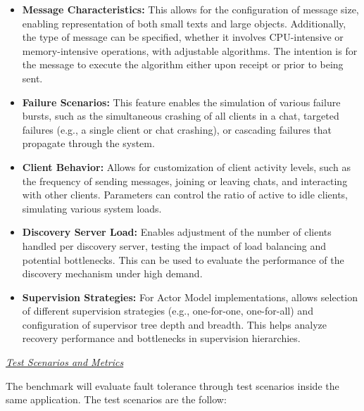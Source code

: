 \begin{itemize}
    \item \textbf{Message Characteristics:} This allows for the configuration of message size, enabling representation of both small texts and large objects. Additionally, the type of message can be specified, whether it involves \gls{CPU}-intensive or memory-intensive operations, with adjustable algorithms. The intention is for the message to execute the algorithm either upon receipt or prior to being sent.

    \item \textbf{Failure Scenarios:} This feature enables the simulation of various failure bursts, such as the simultaneous crashing of all clients in a chat, targeted failures (e.g., a single client or chat crashing), or cascading failures that propagate through the system.

    \item \textbf{Client Behavior:} Allows for customization of client activity levels, such as the frequency of sending messages, joining or leaving chats, and interacting with other clients. Parameters can control the ratio of active to idle clients, simulating various system loads.

    \item \textbf{Discovery Server Load:} Enables adjustment of the number of clients handled per discovery server, testing the impact of load balancing and potential bottlenecks. This can be used to evaluate the performance of the discovery mechanism under high demand.


    \item \textbf{Supervision Strategies:} For Actor Model implementations, allows selection of different supervision strategies (e.g., one-for-one, one-for-all) and configuration of supervisor tree depth and breadth. This helps analyze recovery performance and bottlenecks in supervision hierarchies.

\end{itemize}

\textit{\underline{Test Scenarios and Metrics}}

The benchmark will evaluate fault tolerance through test scenarios inside the same application. The test scenarios are the follow:

